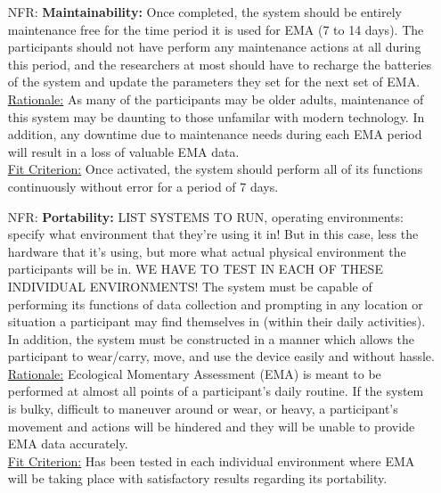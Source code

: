 \documentclass[12pt]{article}
\newcounter{nfrnum} %
\begin{document}
\begin{itemize}
\item[NFR\refstepcounter{nfrnum}\thenfrnum \label{NFR_Maintainability}:]
  \textbf{Maintainability:} Once completed, the system should be entirely maintenance free for the time period it is used for EMA (7 to 14 days). The participants should not have perform any maintenance actions at all during this period, and the researchers at most should have to recharge the batteries of the system and update the parameters they set for the next set of EMA.\\

\underline{Rationale:} As many of the participants may be older adults, maintenance of this system may be daunting to those unfamilar with modern technology. In addition, any downtime due to maintenance needs during each EMA period will result in a loss of valuable EMA data.\\

\underline{Fit Criterion:} Once activated, the system should perform all of its functions continuously without error for a period of 7 days.\\

\item[NFR\refstepcounter{nfrnum}\thenfrnum \label{NFR_Portability}:]
  \textbf{Portability:} LIST SYSTEMS TO RUN, operating environments: specify what environment that they're using it in! But in this case, less the hardware that it's using, but more what actual physical environment the participants will be in. WE HAVE TO TEST IN EACH OF THESE INDIVIDUAL ENVIRONMENTS! The system must be capable of performing its functions of data collection and prompting in any location or situation a participant may find themselves in (within their daily activities). In addition, the system must be constructed in a manner which allows the participant to wear/carry, move, and use the device easily and without hassle.\\

\underline{Rationale:} Ecological Momentary Assessment (EMA) is meant to be performed at almost all points of a participant's daily routine. If the system is bulky, difficult to maneuver around or wear, or heavy, a participant's movement and actions will be hindered and they will be unable to provide EMA data accurately.\\

\underline{Fit Criterion:} Has been tested in each individual environment where EMA will be taking place with satisfactory results regarding its portability.\\



\end{itemize}
\end{document}
